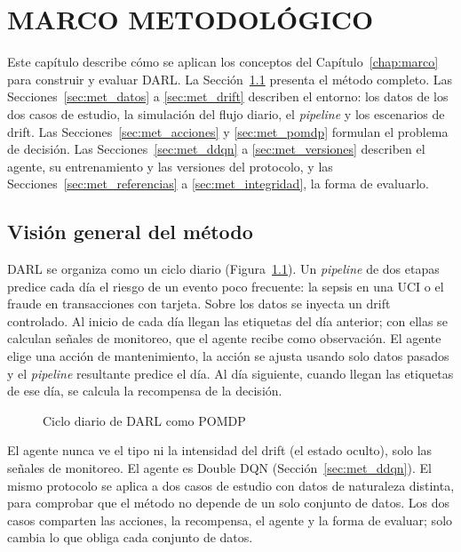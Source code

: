 \chapter{MARCO METODOLÓGICO}
\label{chap:metodologia}

Este capítulo describe cómo se aplican los conceptos del Capítulo~\ref{chap:marco} para construir
y evaluar DARL. La Sección~\ref{sec:met_vision} presenta el método completo. Las
Secciones~\ref{sec:met_datos} a \ref{sec:met_drift} describen el entorno: los datos de los dos
casos de estudio, la simulación del flujo diario, el \textit{pipeline} y los escenarios de drift.
Las Secciones~\ref{sec:met_acciones} y \ref{sec:met_pomdp} formulan el problema de decisión. Las
Secciones~\ref{sec:met_ddqn} a \ref{sec:met_versiones} describen el agente, su entrenamiento y
las versiones del protocolo, y las Secciones~\ref{sec:met_referencias} a
\ref{sec:met_integridad}, la forma de evaluarlo.

\section{Visión general del método}
\label{sec:met_vision}

DARL se organiza como un ciclo diario (Figura~\ref{fig:metodologia_darl}). Un
\textit{pipeline} de dos etapas predice cada día el riesgo de un evento poco frecuente: la
sepsis en una UCI o el fraude en transacciones con tarjeta. Sobre los datos se inyecta un drift
controlado. Al inicio de cada día llegan las etiquetas del día anterior; con ellas se calculan
señales de monitoreo, que el agente recibe como observación. El agente elige una acción de
mantenimiento, la acción se ajusta usando solo datos pasados y el \textit{pipeline} resultante
predice el día. Al día siguiente, cuando llegan las etiquetas de ese día, se calcula la
recompensa de la decisión.

\begin{figure}[H]
    \centering
    \resizebox{0.98\textwidth}{!}{}
    \caption{Ciclo diario de DARL como POMDP}
    \label{fig:metodologia_darl}
\end{figure}

El agente nunca ve el tipo ni la intensidad del drift (el estado oculto), solo las señales de
monitoreo. El agente es Double DQN (Sección~\ref{sec:met_ddqn}). El mismo protocolo se aplica a
dos casos de estudio con datos de naturaleza distinta, para comprobar que el método no depende
de un solo conjunto de datos. Los dos casos comparten las acciones, la recompensa, el agente y
la forma de evaluar; solo cambia lo que obliga cada conjunto de datos.

